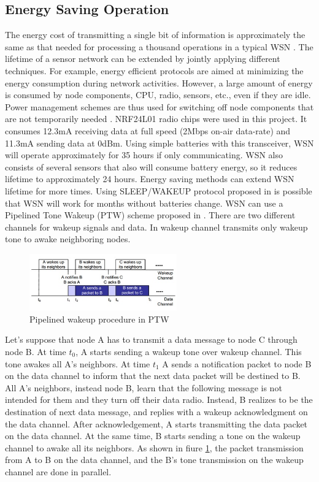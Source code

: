\documentclass[journal]{IEEEtran}
\begin{document}
\subsection{Energy Saving Operation}
The energy cost of transmitting a single bit of information is approximately the same as that needed for processing a thousand operations in a typical WSN \cite{Anastasi}. The lifetime of a sensor network can be extended by jointly applying different techniques. For example, energy efficient protocols are aimed at minimizing the energy consumption during network activities. However, a large amount of energy is consumed by node components, CPU, radio, sensors, etc., even if they are idle. Power management schemes are thus used for switching off node components that are not temporarily needed \cite{Anastasi_Survey}. 
NRF24L01 radio chips were used in this project. It consumes 12.3mA receiving data at full speed (2Mbps on-air data-rate) and 11.3mA sending data at 0dBm. Using simple batteries with this transceiver, WSN will operate approximately for 35 hours if only communicating. WSN also consists of several sensors that also will consume battery energy, so it reduces lifetime to approximately 24 hours.
Energy saving methods can extend WSN lifetime for more times. Using SLEEP/WAKEUP protocol proposed in \cite{Anastasi_Survey} is possible that WSN will work for months without batteries change. WSN can use a Pipelined Tone Wakeup (PTW) scheme proposed in \cite {Yang}. There are two different channels for wakeup signals and data. In wakeup channel transmits only wakeup tone to awake neighboring nodes.
\begin{figure}[!t]
\centering
\includegraphics[width=2.5in]{wake_up}
\caption{Pipelined wakeup procedure in PTW}
\label{wake_up}
\end{figure}
Let’s suppose that node A has to transmit a data message to node C through node B. At time $t_0$, A starts sending a wakeup tone over wakeup channel. This tone awakes all A’s neighbors. At time $t_1$ A sends a notification packet to node B on the data channel to inform that the next data packet will be destined to B. All A’s neighbors, instead node B, learn that the following message is not intended for them and they turn off their data radio. Instead, B realizes to be the destination of next data message, and replies with a wakeup acknowledgment on the data channel. After acknowledgement, A starts transmitting the data packet on the data channel. At the same time, B starts sending a tone on the wakeup channel to awake all its neighbors. As shown in fiure \ref{wake_up}, the packet transmission from A to B on the data channel, and the B’s tone transmission on the wakeup channel are done in parallel.
\end{document}
